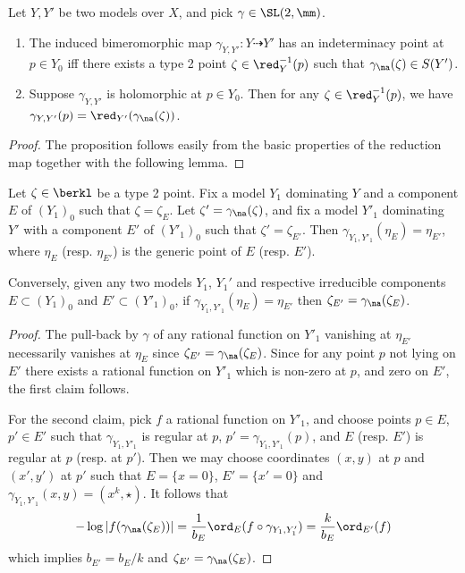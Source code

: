 \begin{prop}\label{prop:val-geom}
Let $Y,Y'$ be two models over $X$, and pick $\gamma\in \SL(2,\mm)$.
\begin{enumerate}
\item The induced bimeromorphic map $\gamma_{Y,Y'}: Y \dashrightarrow Y'$ has an indeterminacy point at $p\in Y_0$ iff there exists a type 2 point $\zeta \in \red^{-1}_{Y}(p)$ such that $\gamma_\na(\zeta) \in S(Y')$.
\item Suppose $\gamma_{Y,Y'}$ is holomorphic at $p\in Y_0$. Then for any $\zeta \in \red_{Y}^{-1}(p)$, we have $\gamma_{Y,Y'}(p) = \red_{Y'} (\gamma_\na(\zeta))$.
\end{enumerate}
\end{prop}

\begin{proof}
The proposition follows easily from the basic properties of the reduction map together with the following lemma.
\end{proof}

\begin{lemm}
Let $\zeta\in\berkl$ be a type 2 point. Fix a model $Y_1$ dominating $Y$ and a component $E$ of $(Y_1)_0$ such that $\zeta = \zeta_E$. Let $\zeta' = \gamma_\na(\zeta)$, and fix a model $Y'_1$ dominating $Y'$ with a component $E'$ of $(Y'_1)_0$ such that $\zeta' = \zeta_{E'}$. Then $\gamma_{Y_1, Y'_1}(\eta_E) = \eta_{E'}$, where $\eta_E$ (resp. $\eta_{E'}$) is the generic point of $E$ (resp. $E'$).

Conversely, given any two models $Y_1$, $Y_1'$ and respective irreducible components $E \subset (Y_1)_0$ and $E' \subset (Y'_1)_0$, if $\gamma_{Y_1, Y'_1}(\eta_E) = \eta_{E'}$ then $\zeta_{E'} = \gamma_\na(\zeta_{E})$.
\end{lemm}

\begin{proof}
The pull-back by $\gamma$ of any rational function on $Y'_1$ vanishing at $\eta_{E'}$ necessarily vanishes at $\eta_E$ since $\zeta_{E'} = \gamma_\na(\zeta_E)$. Since for any point $p$ not lying on $E'$ there exists a rational function on $Y'_1$ which is non-zero at $p$, and zero on $E'$, the first claim follows.

For the second claim, pick $f$ a rational function on $Y'_1$, and choose points $p\in E$, $p'\in E'$ such that $\gamma_{Y_1, Y'_1}$ is regular at $p$, $p' = \gamma_{Y_1, Y'_1}(p)$, and $E$ (resp. $E'$) is regular at $p$ (resp. at $p'$). Then we may choose coordinates $(x,y)$ at $p$ and $(x',y')$ at $p'$ such that $E = \{ x=0\}$, $E' = \{ x'=0\}$ and $\gamma_{Y_1, Y'_1} (x,y) = (x^k, \star)$. It follows that
\[
-\log|f(\gamma_\na(\zeta_{E}))| = \frac1{b_E}\ord_{E}(f \circ \gamma_{Y_1, Y'_1}) = \frac{k}{b_E}\ord_{E'}(f)
\]
which implies $ b_{E'} = b_E/k$ and $\zeta_{E'} = \gamma_\na(\zeta_{E})$.
\end{proof}

